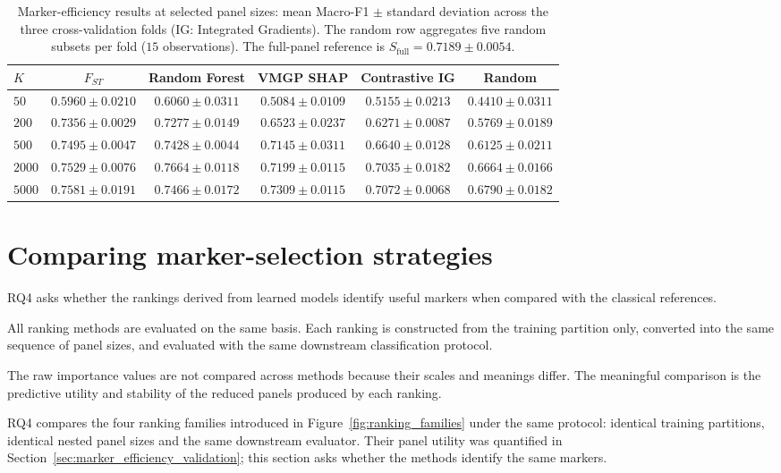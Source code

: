 \begin{table}[ht]
\centering
\caption{Marker-efficiency results at selected panel sizes: mean
Macro-F1 $\pm$ standard deviation across the three cross-validation folds
(IG: Integrated Gradients). The random row aggregates five random
subsets per fold ($15$ observations). The full-panel reference is
$S_{\mathrm{full}} = 0.7189 \pm 0.0054$.}
\label{tab:rq3_selected_k}
\small
\setlength{\tabcolsep}{4pt}
\begin{tabular}{lccccc}
\hline
$K$ & $F_{ST}$ & Random Forest & VMGP SHAP & Contrastive IG & Random \\
\hline
$50$ & $0.5960 \pm 0.0210$ & $0.6060 \pm 0.0311$ & $0.5084 \pm 0.0109$ & $0.5155 \pm 0.0213$ & $0.4410 \pm 0.0311$ \\
$200$ & $0.7356 \pm 0.0029$ & $0.7277 \pm 0.0149$ & $0.6523 \pm 0.0237$ & $0.6271 \pm 0.0087$ & $0.5769 \pm 0.0189$ \\
$500$ & $0.7495 \pm 0.0047$ & $0.7428 \pm 0.0044$ & $0.7145 \pm 0.0311$ & $0.6640 \pm 0.0128$ & $0.6125 \pm 0.0211$ \\
$2000$ & $0.7529 \pm 0.0076$ & $0.7664 \pm 0.0118$ & $0.7199 \pm 0.0115$ & $0.7035 \pm 0.0182$ & $0.6664 \pm 0.0166$ \\
$5000$ & $0.7581 \pm 0.0191$ & $0.7466 \pm 0.0172$ & $0.7309 \pm 0.0115$ & $0.7072 \pm 0.0068$ & $0.6790 \pm 0.0182$ \\
\hline
\end{tabular}
\end{table}

\section{Comparing marker-selection strategies}
\label{sec:marker_ranking_comparison}

RQ4 asks whether the rankings derived from learned models identify
useful markers when compared with the classical references.

All ranking methods are evaluated on the same basis. Each ranking is
constructed from the training partition only, converted into
the same sequence of panel sizes, and evaluated with the same
downstream classification protocol.

The raw importance values are not compared across methods because
their scales and meanings differ. The meaningful comparison is the
predictive utility and stability of the reduced panels produced by
each ranking.

RQ4 compares the four ranking families introduced in
Figure~\ref{fig:ranking_families} under the same protocol: identical
training partitions, identical nested panel sizes and the same
downstream evaluator. Their panel utility was quantified in
Section~\ref{sec:marker_efficiency_validation}; this section asks
whether the methods identify the same markers.

